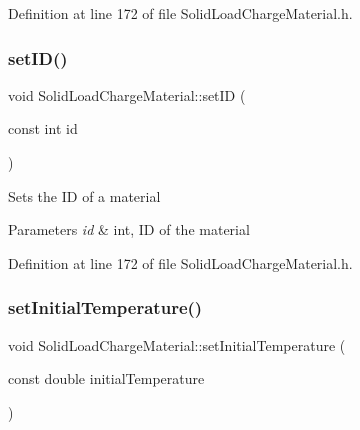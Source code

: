 Definition at line 172 of file Solid\+Load\+Charge\+Material.\+h.

\mbox{\label{class_solid_load_charge_material_a4cc8e12ffb340c94106cecf576a85ae5}} 
\subsubsection{\texorpdfstring{set\+I\+D()}{setID()}\hspace{0.1cm}{\footnotesize\ttfamily [3/3]}}
{\footnotesize\ttfamily void Solid\+Load\+Charge\+Material\+::set\+ID (\begin{DoxyParamCaption}\item[{const int}]{id }\end{DoxyParamCaption})\hspace{0.3cm}{\ttfamily [inline]}}

Sets the ID of a material 
\begin{DoxyParams}{Parameters}
{\em id} & int, ID of the material \\
\hline
\end{DoxyParams}


Definition at line 172 of file Solid\+Load\+Charge\+Material.\+h.

\mbox{\label{class_solid_load_charge_material_ac80e565d26e68e542f4cb41f41b7d96c}} 
\subsubsection{\texorpdfstring{set\+Initial\+Temperature()}{setInitialTemperature()}\hspace{0.1cm}{\footnotesize\ttfamily [1/3]}}
{\footnotesize\ttfamily void Solid\+Load\+Charge\+Material\+::set\+Initial\+Temperature (\begin{DoxyParamCaption}\item[{const double}]{initial\+Temperature }\end{DoxyParamCaption})\hspace{0.3cm}{\ttfamily [inline]}}

